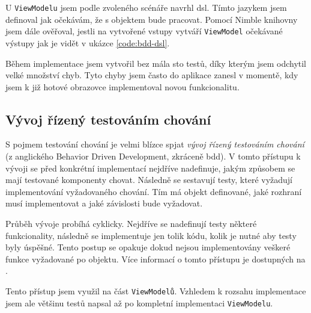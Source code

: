 U \texttt{ViewModelu} jsem podle zvoleného scénáře navrhl \acrshort{dsl}.
Tímto jazykem jsem definoval jak očekávám, že s objektem bude pracovat.
Pomocí Nimble knihovny jsem dále ověřoval, jestli na vytvořené vstupy vytváří \texttt{ViewModel} očekávané výstupy jak je vidět v ukázce \ref{code:bdd-dsl}.

Během implementace jsem vytvořil bez mála sto testů, díky kterým jsem odchytil velké množství chyb.
Tyto chyby jsem často do aplikace zanesl v momentě, kdy jsem k již hotové obrazovce implementoval novou funkcionalitu.


\subsection{Vývoj řízený testováním chování}

S pojmem testování chování je velmi blízce spjat \textit{vývoj řízený testováním chování} (z anglického Behavior Driven Development, zkráceně \acrshort{bdd}).
V tomto přístupu k vývoji se před konkrétní implementací nejdříve nadefinuje, jakým způsobem se mají testované komponenty chovat.
Následně se sestavují testy, které vyžadují implementování vyžadovaného chování.
Tím má objekt definované, jaké rozhraní musí implementovat a jaké závislosti bude vyžadovat.

Průběh vývoje probíhá cyklicky.
Nejdříve se nadefinují testy některé funkcionality, následně se implementuje jen tolik kódu, kolik je nutné aby testy byly úspěšné.
Tento postup se opakuje dokud nejsou implementovány veškeré funkce vyžadované po objektu.
Více informací o tomto přístupu je dostupných na \cite{objcio-bdd}.

Tento přístup jsem využil na část \texttt{ViewModelů}.
Vzhledem k rozsahu implementace jsem ale většinu testů napsal až po kompletní implementaci \texttt{ViewModelu}.
